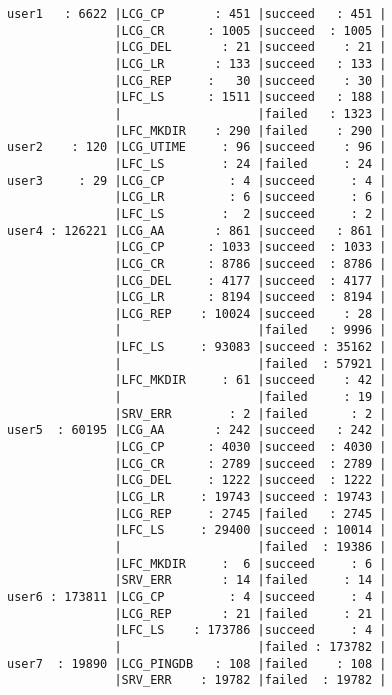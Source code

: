 \documentclass[a4paper, 11pt]{article} %
\begin{document}
\begin{center}
\begin{lstlisting}[style=cli, label={out:usercommandresulttable}, caption={lfc\_analyzer -i logfile -u -c -r}]
user1   : 6622 |LCG_CP       : 451 |succeed   : 451 |
               |LCG_CR      : 1005 |succeed  : 1005 |
               |LCG_DEL       : 21 |succeed    : 21 |
               |LCG_LR       : 133 |succeed   : 133 |
               |LCG_REP     :   30 |succeed    : 30 |
               |LFC_LS      : 1511 |succeed   : 188 |
               |                   |failed   : 1323 |
               |LFC_MKDIR    : 290 |failed    : 290 |
user2    : 120 |LCG_UTIME     : 96 |succeed    : 96 |
               |LFC_LS        : 24 |failed     : 24 |
user3     : 29 |LCG_CP         : 4 |succeed     : 4 |
               |LCG_LR         : 6 |succeed     : 6 |
               |LFC_LS        :  2 |succeed     : 2 |
user4 : 126221 |LCG_AA       : 861 |succeed   : 861 |
               |LCG_CP      : 1033 |succeed  : 1033 |
               |LCG_CR      : 8786 |succeed  : 8786 |
               |LCG_DEL     : 4177 |succeed  : 4177 |
               |LCG_LR      : 8194 |succeed  : 8194 |
               |LCG_REP    : 10024 |succeed    : 28 |
               |                   |failed   : 9996 |
               |LFC_LS     : 93083 |succeed : 35162 |
               |                   |failed  : 57921 |
               |LFC_MKDIR     : 61 |succeed    : 42 |
               |                   |failed     : 19 |
               |SRV_ERR        : 2 |failed      : 2 |
user5  : 60195 |LCG_AA       : 242 |succeed   : 242 |
               |LCG_CP      : 4030 |succeed  : 4030 |
               |LCG_CR      : 2789 |succeed  : 2789 |
               |LCG_DEL     : 1222 |succeed  : 1222 |
               |LCG_LR     : 19743 |succeed : 19743 |
               |LCG_REP     : 2745 |failed   : 2745 |
               |LFC_LS     : 29400 |succeed : 10014 |
               |                   |failed  : 19386 |
               |LFC_MKDIR     :  6 |succeed     : 6 |
               |SRV_ERR       : 14 |failed     : 14 |
user6 : 173811 |LCG_CP         : 4 |succeed     : 4 |
               |LCG_REP       : 21 |failed     : 21 |
               |LFC_LS    : 173786 |succeed     : 4 |
               |                   |failed : 173782 |
user7  : 19890 |LCG_PINGDB   : 108 |failed    : 108 |
               |SRV_ERR    : 19782 |failed  : 19782 |
\end{lstlisting}
\end{center}
\end{document}
